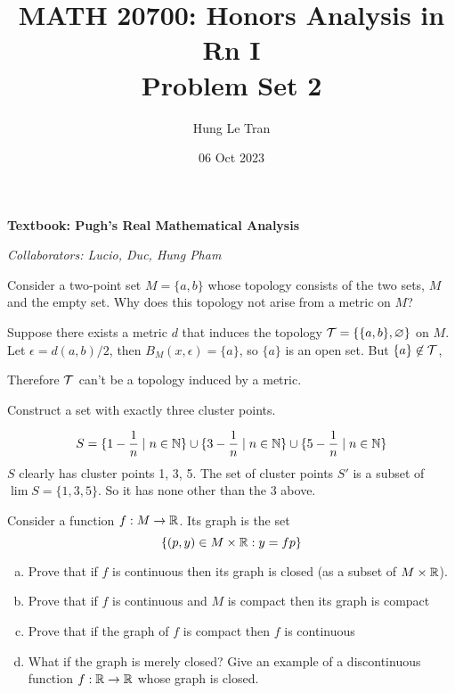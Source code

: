 \documentclass[a4paper, 12pt]{article}
\title{MATH 20700: Honors Analysis in Rn I \\ \large Problem Set 2}
\date{06 Oct 2023}
\author{Hung Le Tran}
\begin{document}
\maketitle
\setcounter{section}{2}
\textbf{Textbook: Pugh's Real Mathematical Analysis}

\textit{Collaborators: Lucio, Duc, Hung Pham}
\begin{problem} [2.30]
Consider a two-point set $M = \{a, b\}$ whose topology consists of the two sets, $M$ and the empty set. Why does this topology not arise from a metric on $M$?
\end{problem}
\begin{solution}
    Suppose there exists a metric $d$ that induces the topology $\mathcal{T} = \{\{a, b\}, \varnothing\}$ on $M$. Let $\epsilon = d(a, b)/2$, then $B_M(x, \epsilon) = \{a\}$, so $\{a\}$ is an open set. But $\{a\} \not \in \mathcal{T}$, \contra

    Therefore $\mathcal{T}$ can't be a topology induced by a metric.
\end{solution}

\begin{problem} [2.36]
Construct a set with exactly three cluster points.
\end{problem}
\begin{solution}
    \[
        S = \{1 - \frac{1}{n} \mid n \in \mathbb{N}\} \cup \{ 3 - \frac{1}{n} \mid n \in \mathbb{N}\} \cup \{5 - \frac{1}{n} \mid n \in \mathbb{N}\}
    \]
    $S$ clearly has cluster points 1, 3, 5. The set of cluster points $S'$ is a subset of $\lim S = \{1, 3, 5\}$. So it has none other than the 3 above.
\end{solution}

\begin{problem} [2.44]
Consider a function $f: M \to \mathbb{R}$. Its graph is the set \[
    \{(p, y) \in M \times \mathbb{R} : y = fp\}
\]

\begin{enumerate} [(a)]
    \item Prove that if $f$ is continuous then its graph is closed (as a subset of $M \times \mathbb{R}$).
    \item Prove that if $f$ is continuous and $M$ is compact then its graph is compact
    \item Prove that if the graph of $f$ is compact then $f$ is continuous
    \item What if the graph is merely closed? Give an example of a discontinuous function $f: \mathbb{R} \to \mathbb{R}$ whose graph is closed.
\end{enumerate}
\end{problem}
\end{document}
